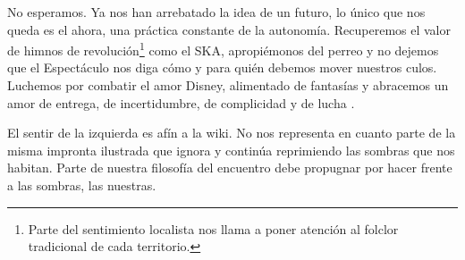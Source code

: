 No esperamos. Ya nos han arrebatado la idea de un futuro, lo único que
nos queda es el ahora, una práctica constante de la autonomía.
Recuperemos el valor de himnos de revolución\footnote{Parte del
  sentimiento localista nos llama a poner atención al folclor
  tradicional de cada territorio.} como el SKA, apropiémonos del perreo
y no dejemos que el Espectáculo nos diga cómo y para quién debemos mover
nuestros culos. Luchemos por combatir el amor Disney, alimentado de
fantasías y abracemos un amor de entrega, de incertidumbre, de
complicidad y de lucha \cite{Vasallo2014}.

El sentir de la izquierda es afín a la wiki. No nos representa en cuanto
parte de la misma impronta ilustrada que ignora y continúa reprimiendo
las sombras que nos habitan. Parte de nuestra filosofía del encuentro
debe propugnar por hacer frente a las sombras, las nuestras.
